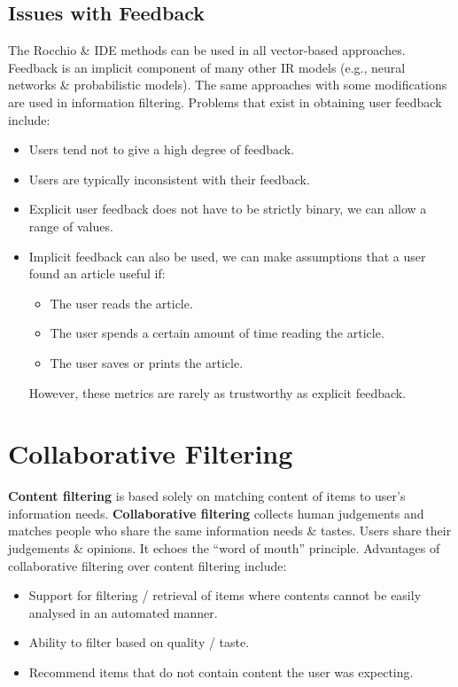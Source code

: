 \documentclass[a4paper,11pt]{article}
\begin{document}
\subsection{Issues with Feedback}
The Rocchio \& IDE methods can be used in all vector-based approaches.
Feedback is an implicit component of many other IR models (e.g., neural networks \& probabilistic models).
The same approaches with some modifications are used in information filtering.
Problems that exist in obtaining user feedback include:
\begin{itemize}
    \item   Users tend not to give a high degree of feedback.
    \item   Users are typically inconsistent with their feedback.
    \item   Explicit user feedback does not have to be strictly binary, we can allow a range of values.
    \item   Implicit feedback can also be used, we can make assumptions that a user found an article useful if:
            \begin{itemize}
                \item   The user reads the article.
                \item   The user spends a certain amount of time reading the article.
                \item   The user saves or prints the article.
            \end{itemize}

            However, these metrics are rarely as trustworthy as explicit feedback.
\end{itemize}

\section{Collaborative Filtering}
\textbf{Content filtering} is based solely on matching content of items to user's information needs.
\textbf{Collaborative filtering} collects human judgements and matches people who share the same information needs \& tastes.
Users share their judgements \& opinions.
It echoes the ``word of mouth'' principle.
Advantages of collaborative filtering over content filtering include:
\begin{itemize}
    \item   Support for filtering / retrieval of items where contents cannot be easily analysed in an automated manner.
    \item   Ability to filter based on quality / taste.
    \item   Recommend items that do not contain content the user was expecting.
\end{itemize}
\end{document}
